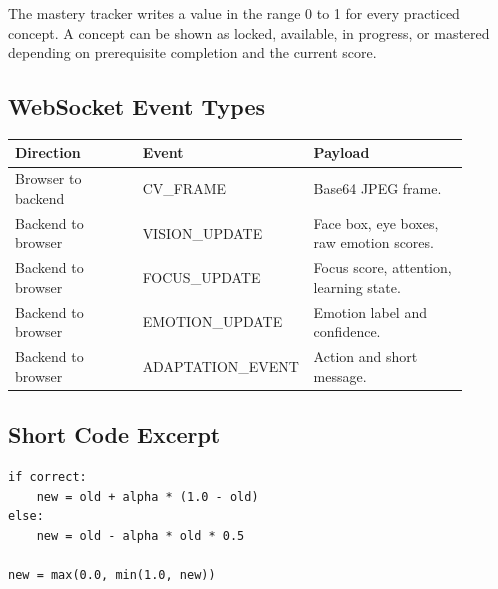 The mastery tracker writes a value in the range 0 to 1 for every practiced concept. A concept can be shown as locked, available, in progress, or mastered depending on prerequisite completion and the current score.

\subsection{WebSocket Event Types}

\begin{center}
\scriptsize
\renewcommand{\arraystretch}{1.08}
\begin{tabular}{p{0.28\linewidth}p{0.28\linewidth}p{0.34\linewidth}}
\toprule
\textbf{Direction} & \textbf{Event} & \textbf{Payload} \\
\midrule
Browser to backend & CV\_FRAME & Base64 JPEG frame. \\
Backend to browser & VISION\_UPDATE & Face box, eye boxes, raw emotion scores. \\
Backend to browser & FOCUS\_UPDATE & Focus score, attention, learning state. \\
Backend to browser & EMOTION\_UPDATE & Emotion label and confidence. \\
Backend to browser & ADAPTATION\_EVENT & Action and short message. \\
\bottomrule
\end{tabular}
\end{center}

\subsection{Short Code Excerpt}

\begin{lstlisting}[style=codeblock]
if correct:
    new = old + alpha * (1.0 - old)
else:
    new = old - alpha * old * 0.5

new = max(0.0, min(1.0, new))
\end{lstlisting}
